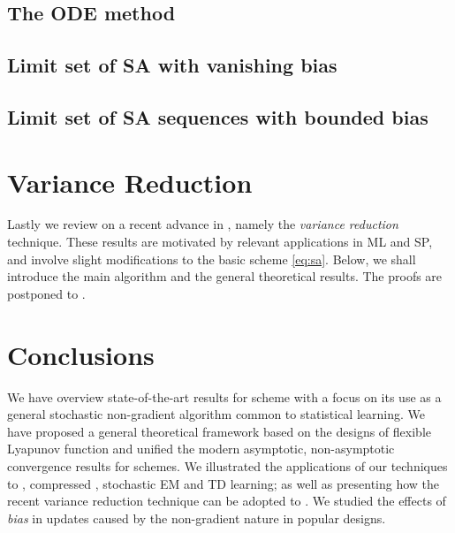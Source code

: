 \documentclass[10pt,twocolumn,twoside]{IEEEtran}
\begin{document}
\subsection{The ODE method}
\label{subsec:ODE-method}

\subsection{Limit set of SA with vanishing bias}
\label{subsec:limit-sets}


\subsection{Limit set of SA sequences with bounded bias}
\label{subsec:asymptotic-convergence-bias}


\section{Variance Reduction}\label{sec:vr}
Lastly we review on a recent advance in {\SA}, namely the \emph{variance reduction} technique. 
These results are motivated by relevant applications in ML and SP, and involve slight modifications to the basic {\SA} scheme \eqref{eq:sa}. Below, we shall introduce the main algorithm and the general theoretical results. 
The proofs are postponed to .

\label{subsec:variance-reduction}

%

\section{Conclusions}
We have overview state-of-the-art results for {\SA} scheme with a focus on its use as a general stochastic non-gradient algorithm common to statistical learning. We have proposed 
a general theoretical framework based on the designs of flexible Lyapunov function and unified the modern asymptotic, non-asymptotic convergence results for {\SA} schemes. We illustrated the applications of our techniques to {\SG}, compressed {\SA}, stochastic EM and TD learning; as well as presenting how the recent variance reduction technique can be adopted to {\SA}. We studied the effects of \emph{bias} in {\SA} updates caused by the non-gradient nature in popular designs.  
\end{document}
